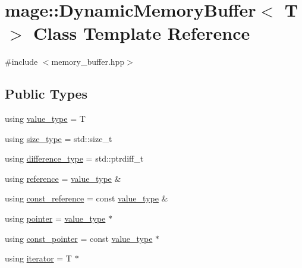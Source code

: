 \hypertarget{classmage_1_1_dynamic_memory_buffer}{}\section{mage\+:\+:Dynamic\+Memory\+Buffer$<$ T $>$ Class Template Reference}
\label{classmage_1_1_dynamic_memory_buffer}


{\ttfamily \#include $<$memory\+\_\+buffer.\+hpp$>$}

\subsection*{Public Types}
\begin{DoxyCompactItemize}
\item 
using \mbox{\hyperlink{classmage_1_1_dynamic_memory_buffer_a951f47f06268fe148ed617d17cad6150}{value\+\_\+type}} = T
\item 
using \mbox{\hyperlink{classmage_1_1_dynamic_memory_buffer_a45d02825da2b18fd7c24965ed5f46a30}{size\+\_\+type}} = std\+::size\+\_\+t
\item 
using \mbox{\hyperlink{classmage_1_1_dynamic_memory_buffer_ae708f71fce978c1029c2228c249316a6}{difference\+\_\+type}} = std\+::ptrdiff\+\_\+t
\item 
using \mbox{\hyperlink{classmage_1_1_dynamic_memory_buffer_a146681be5119c0329409436506334f05}{reference}} = \mbox{\hyperlink{classmage_1_1_dynamic_memory_buffer_a951f47f06268fe148ed617d17cad6150}{value\+\_\+type}} \&
\item 
using \mbox{\hyperlink{classmage_1_1_dynamic_memory_buffer_aa454489303e19392c54044d3b3ae67ad}{const\+\_\+reference}} = const \mbox{\hyperlink{classmage_1_1_dynamic_memory_buffer_a951f47f06268fe148ed617d17cad6150}{value\+\_\+type}} \&
\item 
using \mbox{\hyperlink{classmage_1_1_dynamic_memory_buffer_aa6880dd44d3de70601a158b693b98310}{pointer}} = \mbox{\hyperlink{classmage_1_1_dynamic_memory_buffer_a951f47f06268fe148ed617d17cad6150}{value\+\_\+type}} $\ast$
\item 
using \mbox{\hyperlink{classmage_1_1_dynamic_memory_buffer_af1721cabd35311ed93a51e8dc973fda7}{const\+\_\+pointer}} = const \mbox{\hyperlink{classmage_1_1_dynamic_memory_buffer_a951f47f06268fe148ed617d17cad6150}{value\+\_\+type}} $\ast$
\item 
using \mbox{\hyperlink{classmage_1_1_dynamic_memory_buffer_aa5dca8e81d0c2a9e63d3a9bc61cce904}{iterator}} = T $\ast$

\end{DoxyCompactItemize}
